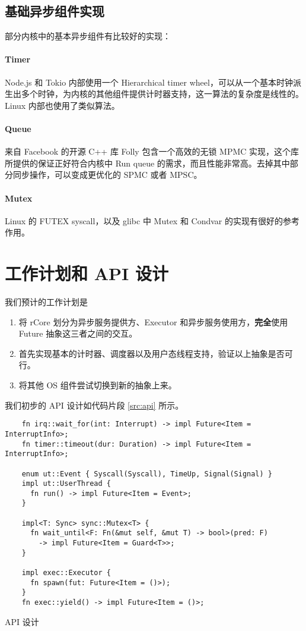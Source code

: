 \documentclass[UTF-8]{ctexart}
\begin{document}
  \subsection{基础异步组件实现}
  部分内核中的基本异步组件有比较好的实现：
  
  \paragraph{Timer} Node.js 和 Tokio 内部使用一个 Hierarchical timer wheel，可以从一个基本时钟派生出多个时钟，为内核的其他组件提供计时器支持，这一算法的复杂度是线性的。Linux 内部也使用了类似算法。

  \paragraph{Queue} 来自 Facebook 的开源 C++ 库 Folly 包含一个高效的无锁 MPMC 实现，这个库所提供的保证正好符合内核中 Run queue 的需求，而且性能非常高。去掉其中部分同步操作，可以变成更优化的 SPMC 或者 MPSC。
  
  \paragraph{Mutex} Linux 的 FUTEX syscall，以及 glibc 中 Mutex 和 Condvar 的实现有很好的参考作用。

  \section{工作计划和 API 设计}
  我们预计的工作计划是

  \begin{enumerate}
    \item 将 rCore 划分为异步服务提供方、Executor 和异步服务使用方，\textbf{完全}使用 Future 抽象这三者之间的交互。
    \item 首先实现基本的计时器、调度器以及用户态线程支持，验证以上抽象是否可行。
    \item 将其他 OS 组件尝试切换到新的抽象上来。
  \end{enumerate}

  我们初步的 API 设计如代码片段 \ref{src:api} 所示。

  \begin{listing}[H]
  \begin{verbatim}
    fn irq::wait_for(int: Interrupt) -> impl Future<Item = InterruptInfo>;
    fn timer::timeout(dur: Duration) -> impl Future<Item = InterruptInfo>;

    enum ut::Event { Syscall(Syscall), TimeUp, Signal(Signal) }
    impl ut::UserThread {
      fn run() -> impl Future<Item = Event>;
    }

    impl<T: Sync> sync::Mutex<T> {
      fn wait_until<F: Fn(&mut self, &mut T) -> bool>(pred: F)
        -> impl Future<Item = Guard<T>>;
    }

    impl exec::Executor {
      fn spawn(fut: Future<Item = ()>);
    }
    fn exec::yield() -> impl Future<Item = ()>;
  \end{verbatim}

  \caption{API 设计}
  \label{src:api}
  \end{listing}
\end{document}
